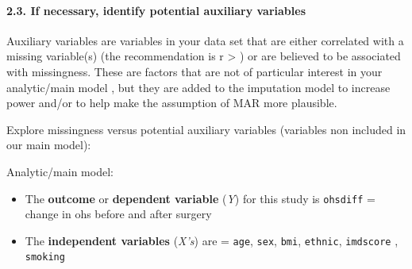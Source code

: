 \documentclass[
]{article}
\providecommand{\tightlist}{%
  \setlength{\itemsep}{0pt}\setlength{\parskip}{0pt}}
\begin{document}
\hypertarget{if-necessary-identify-potential-auxiliary-variables}{%
\paragraph{2.3. If necessary, identify potential auxiliary
variables}\label{if-necessary-identify-potential-auxiliary-variables}}

Auxiliary variables are variables in your data set that are either
correlated with a missing variable(s) (the recommendation is r
\textgreater{} \textbar) or are believed to be associated
with missingness. These are factors that are not of particular interest
in your analytic/main model , but they are added to the imputation model
to increase power and/or to help make the assumption of MAR more
plausible.

Explore missingness versus potential auxiliary variables (variables non
included in our main model):

Analytic/main model:

\begin{itemize}
\tightlist
\item
  The \textbf{outcome} or \textbf{dependent variable} (\emph{Y}) for
  this study is \texttt{ohsdiff} = change in ohs before and after
  surgery
\item
  The \textbf{independent variables} (\emph{X's}) are = \texttt{age},
  \texttt{sex}, \texttt{bmi}, \texttt{ethnic}, \texttt{imdscore} ,
  \texttt{smoking}
\end{itemize}
\end{document}
